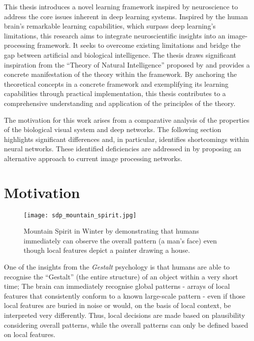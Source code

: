 This thesis introduces a novel learning framework inspired by neuroscience to address the core issues inherent in deep learning systems. Inspired by the human brain's remarkable learning capabilities, which surpass deep learning's limitations, this research aims to integrate neuroscientific insights into an image-processing framework. It seeks to overcome existing limitations and bridge the gap between artificial and biological intelligence. The thesis draws significant inspiration from the ``Theory of Natural Intelligence'' proposed by  and provides a concrete manifestation of the theory within the framework. By anchoring the theoretical concepts in a concrete framework and exemplifying its learning capabilities through practical implementation, this thesis contributes to a comprehensive understanding and application of the principles of the theory.

The motivation for this work arises from a comparative analysis of the properties of the biological visual system and deep networks. The following section highlights significant differences and, in particular, identifies shortcomings within neural networks. These identified deficiencies are addressed in  by proposing an alternative approach to current image processing networks.

\section{Motivation}
\begin{figure}[h]
    \centering
    \texttt{[image: sdp\_mountain\_spirit.jpg]}
    \caption[Mountain Spirit in Winter by Sandro del Prete]{Mountain Spirit in Winter by  demonstrating that humans immediately can observe the overall pattern (a man's face) even though local features depict a painter drawing a house.}
\end{figure}

One of the insights from the \emph{Gestalt} psychology  is that humans are able to recognise the ``Gestalt'' (the entire structure) of an object within a very short time; The brain can immediately recognise global patterns - arrays of local features that consistently conform to a known large-scale pattern - even if those local features are buried in noise or would, on the basis of local context, be interpreted very differently. Thus, local decisions are made based on plausibility considering overall patterns, while the overall patterns can only be defined based on local features.

